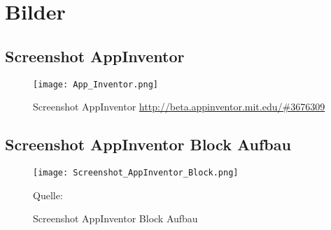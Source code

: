 \newpage
\section{Bilder}
\label{sec:Anhang_Bilder}


\subsection{Screenshot AppInventor}
\begin{figure}[h!]
\label{fig:App_Inventor}
\centering
\texttt{[image: App\_Inventor.png]} 
\caption{Screenshot AppInventor \url{http://beta.appinventor.mit.edu/\#3676309}}
\end{figure}


\subsection{Screenshot AppInventor Block Aufbau}
\begin{figure}[h!]
\label{fig:Screenshot_AppInventor_Block}
\centering
\texttt{[image: Screenshot\_AppInventor\_Block.png]} 
\caption{Screenshot AppInventor Block Aufbau }
Quelle: \cite{App_Inventor_Block}
\end{figure}


